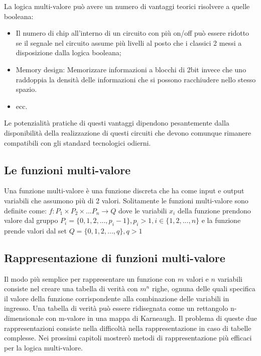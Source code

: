 \documentclass[
]{book}
\providecommand{\tightlist}{%
  \setlength{\itemsep}{0pt}\setlength{\parskip}{0pt}}
\begin{document}
La logica multi-valore può avere un numero di vantaggi teorici risolvere a quelle booleana:

\begin{itemize}
\tightlist
\item
  Il numero di chip all'interno di un circuito con più on/off può essere ridotto se il segnale nel circuito assume più livelli al posto che i classici 2 messi a disposizione dalla logica booleana;
\item
  Memory design: Memorizzare informazioni a blocchi di 2bit invece che uno raddoppia la densità delle informazioni che si possono racchiudere nello stesso spazio.
\item
  ecc.
\end{itemize}

Le potenzialità pratiche di questi vantaggi dipendono pesantemente dalla disponibilità della realizzazione di questi circuiti che devono comunque rimanere compatibili con gli standard tecnologici odierni. \citep{gao2002optimization}

\newpage

\hypertarget{le-funzioni-multi-valore}{%
\subsection{Le funzioni multi-valore}\label{le-funzioni-multi-valore}}

Una funzione multi-valore è una funzione discreta che ha come input e output variabili che assumono più di 2 valori. Solitamente le funzioni multi-valore sono definite come: \(f: P_1 \times P_2 \times ... P_n \rightarrow Q\) dove le variabili \(x_i\) della funzione prendono valore dal gruppo \(P_i = \{ 0,1,2,...,p_i-1 \}, p_i > 1 , i \in \{ 1,2,...,n\}\) e la funzione prende valori dal set \(Q = \{0,1,2,...,q\}, q>1\)

\hypertarget{rappresentazione-di-funzioni-multi-valore}{%
\subsection{Rappresentazione di funzioni multi-valore}\label{rappresentazione-di-funzioni-multi-valore}}

Il modo più semplice per rappresentare un funzione con \(m\) valori e \(n\) variabili consiste nel creare una tabella di verità con \(m^n\) righe, ognuna delle quali specifica il valore della funzione corrispondente alla combinazione delle variabili in ingresso. Una tabella di verità può essere ridisegnata come un rettangolo n-dimensionale con m-valore in una mappa di Karneaugh. Il problema di queste due rappresentazioni consiste nella difficoltà nella rappresentazione in caso di tabelle complesse. Nei prossimi capitoli mostrerò metodi di rappresentazione più efficaci per la logica multi-valore.
\end{document}
